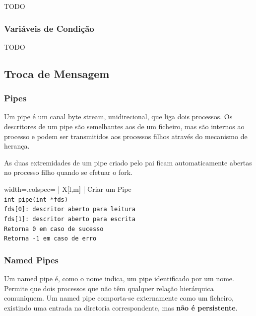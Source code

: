 \documentclass[11pt]{article}
\begin{document}
TODO

\subsubsection{Variáveis de Condição}

TODO

\newpage

\subsection{Troca de Mensagem}

\subsubsection{Pipes}

Um pipe é um canal byte stream, unidirecional, que liga dois processos. Os descritores de um pipe são semelhantes aos de um ficheiro, mas são internos ao processo e podem ser transmitidos aos processos filhos através do mecanismo de herança.

As duas extremidades de um pipe criado pelo pai ficam automaticamente abertas no processo filho quando se efetuar o fork.

\begin{tblr}{width=\linewidth,colspec={ | X[l,m] | }}
    \hline
    \centering Criar um Pipe                          \\\hline
    \lstinline|int pipe(int *fds)|                    \\\hline
    \lstinline|fds[0]: descritor aberto para leitura| \\
    \lstinline|fds[1]: descritor aberto para escrita| \\\hline
    \lstinline|Retorna 0 em caso de sucesso|          \\
    \lstinline|Retorna -1 em caso de erro|            \\\hline
\end{tblr}

\subsubsection{Named Pipes}
Um named pipe é, como o nome indica, um pipe identificado por um nome. Permite que dois processos que não têm qualquer relação hierárquica comuniquem. Um named pipe comporta-se externamente como um ficheiro, existindo uma entrada na diretoria correspondente, mas \textbf{não é persistente}.
\end{document}
